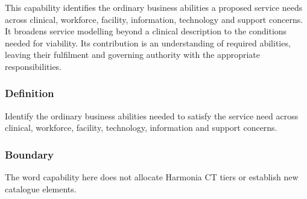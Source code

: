 This capability identifies the ordinary business abilities a proposed service needs across clinical, workforce, facility, information, technology and support concerns. It broadens service modelling beyond a clinical description to the conditions needed for viability. Its contribution is an understanding of required abilities, leaving their fulfilment and governing authority with the appropriate responsibilities.

\subsubsection*{Definition}

Identify the ordinary business abilities needed to satisfy the service need across clinical, workforce, facility, technology, information and support concerns.

\subsubsection*{Boundary}

The word capability here does not allocate Harmonia CT tiers or establish new catalogue elements.

